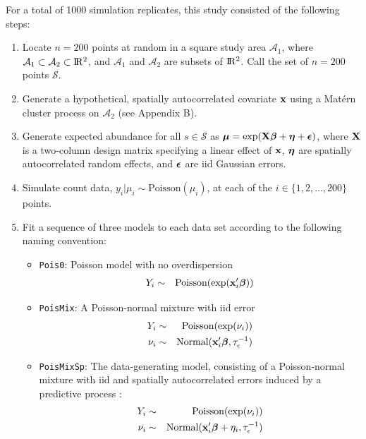 \documentclass[12pt,english]{article}
\begin{document}
\begin{spacing}{1.9}
For a total of 1000 simulation replicates, this study consisted of the following steps:
\begin{enumerate}
  \item Locate $n=200$ points at random in a square study area $\mathcal{A}_1$, where $\mathcal{A}_1 \subset \mathcal{A}_2 \subset \R2$, and $\mathcal{A}_1$ and $\mathcal{A}_2$ are subsets of $\R2$.  Call the set of $n=200$ points $\mathcal{S}$.
  \item Generate a hypothetical, spatially autocorrelated covariate ${\bf x}$ using a Mat\'{e}rn cluster process on $\mathcal{A}_2$ (see Appendix B).
  \item  Generate expected abundance for all $s \in \mathcal{S}$ as $\boldsymbol{\mu} = \exp( {\bf X}\boldsymbol{\beta} + \boldsymbol{\eta} +\boldsymbol{\epsilon} )$, where ${\bf X}$ is a two-column design matrix specifying a linear effect of ${\bf x}$, $\boldsymbol{\eta}$ are spatially autocorrelated random effects, and $\boldsymbol{\epsilon}$ are iid Gaussian errors.
  \item Simulate count data, $y_i|\mu_i \sim \textrm{Poisson}(\mu_i)$, at each of the $i \in \{ 1,2,\hdots,200 \}$ points.
  \item Fit a sequence of three models to each data set according to the following naming convention:
      \begin{itemize}
        \item \texttt{Pois0}: Poisson model with no overdispersion
         \begin{eqnarray*}
           Y_i & \sim & \textrm{Poisson}(\exp({\bf x}_i^\prime \boldsymbol{\beta})) \\
         \end{eqnarray*}
        \item \texttt{PoisMix}: A Poisson-normal mixture with iid error
         \begin{eqnarray*}
           Y_i & \sim & \textrm{Poisson}(\exp(\nu_i)) \\
           \nu_i & \sim & \textrm{Normal}({\bf x}_i^\prime \boldsymbol{\beta}, \tau_\epsilon^{-1})\\
          \end{eqnarray*}
        \item \texttt{PoisMixSp}: The data-generating model, consisting of a Poisson-normal mixture with iid and spatially autocorrelated errors induced by a predictive process \citep[cf.][]{BanerjeeEtAl2008}:
          \begin{eqnarray*}
           Y_i & \sim & \textrm{Poisson}(\exp(\nu_i)) \\
           \nu_i & \sim & \textrm{Normal}(\bfx_i^\prime \bfbeta + \eta_i, \tau_\epsilon^{-1}) \\

\end{eqnarray*}
\end{itemize}
\end{enumerate}
\end{spacing}
\end{document}
